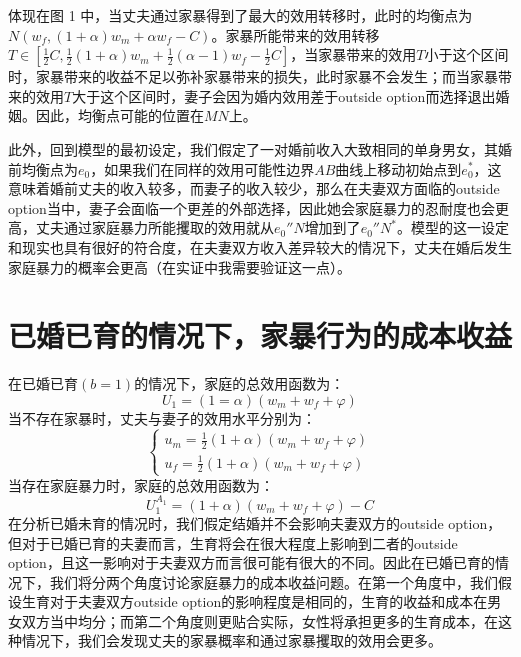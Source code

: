\documentclass[a4paper,zihao=-4,UTF8]{ctexart}
\begin{document}
体现在图 1 中，当丈夫通过家暴得到了最大的效用转移时，此时的均衡点为$N(w_f,(1+\alpha)w_m+\alpha w_f-C)$。家暴所能带来的效用转移$T \in [\frac{1}{2}C, \frac{1}{2}(1+\alpha)w_m+\frac{1}{2}(\alpha -1) w_f-\frac{1}{2}C]$，当家暴带来的效用$T$小于这个区间时，家暴带来的收益不足以弥补家暴带来的损失，此时家暴不会发生；而当家暴带来的效用$T$大于这个区间时，妻子会因为婚内效用差于outside option而选择退出婚姻。因此，均衡点可能的位置在$MN$上。

此外，回到模型的最初设定，我们假定了一对婚前收入大致相同的单身男女，其婚前均衡点为$e_0$，如果我们在同样的效用可能性边界$AB$曲线上移动初始点到$e_0^*$，这意味着婚前丈夫的收入较多，而妻子的收入较少，那么在夫妻双方面临的outside option当中，妻子会面临一个更差的外部选择，因此她会家庭暴力的忍耐度也会更高，丈夫通过家庭暴力所能攫取的效用就从$e_0''N$增加到了$e_0''N^*$。模型的这一设定和现实也具有很好的符合度，在夫妻双方收入差异较大的情况下，丈夫在婚后发生家庭暴力的概率会更高（在实证中我需要验证这一点）。

	\section*{已婚已育的情况下，家暴行为的成本收益}	
	在已婚已育$(b=1)$的情况下，家庭的总效用函数为：
	\begin{equation}
		U_1=(1=\alpha)(w_m+w_f+\varphi)
	\end{equation}
	当不存在家暴时，丈夫与妻子的效用水平分别为：
		\begin{equation}
		\left\{
		\begin{array}{lr}
			u_m = \frac{1}{2}(1+\alpha)(w_m+w_f+\varphi) \\
			u_f =  \frac{1}{2}(1+\alpha)(w_m+w_f+\varphi)
		\end{array}
		\right.
	\end{equation}
	当存在家庭暴力时，家庭的总效用函数为：
	\begin{equation}
		U_1^{A_1}=(1+\alpha)(w_m+w_f+\varphi)-C
	\end{equation}
	在分析已婚未育的情况时，我们假定结婚并不会影响夫妻双方的outside option，但对于已婚已育的夫妻而言，生育将会在很大程度上影响到二者的outside option，且这一影响对于夫妻双方而言很可能有很大的不同。因此在已婚已育的情况下，我们将分两个角度讨论家庭暴力的成本收益问题。在第一个角度中，我们假设生育对于夫妻双方outside option的影响程度是相同的，生育的收益和成本在男女双方当中均分；而第二个角度则更贴合实际，女性将承担更多的生育成本，在这种情况下，我们会发现丈夫的家暴概率和通过家暴攫取的效用会更多。
\end{document}
